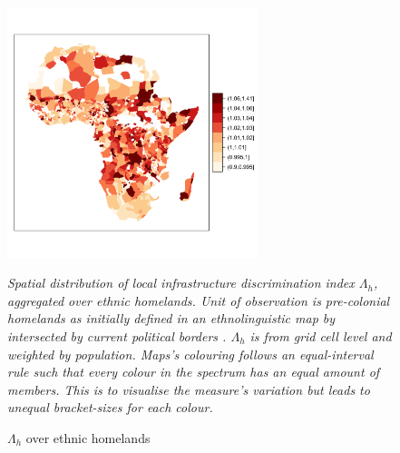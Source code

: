 \documentclass[11pt, oneside]{article}   	%
\newcommand{\mysubcaption}[1]{
\justify
\begin{spacing}{0.7}
\textit{\footnotesize #1}
\end{spacing}}
\begin{document}
\begin{figure}[!ph]
\centering
\caption{$\Lambda_{h}$ over ethnic homelands}

\includegraphics[width=0.65\textwidth,trim={1cm 4cm 0cm 4.5cm},clip]{../../Analysis/output/other_maps/ethnicity_zeta.png}


\label{fig:ethn_maps}
\mysubcaption{Spatial distribution of local infrastructure discrimination index $\Lambda_{h}$, aggregated over ethnic homelands. Unit of observation is pre-colonial homelands as initially defined in an ethnolinguistic map by \cite{Murdock_Africaitspeoples_1959} intersected by current political borders  \citep[following][]{Michalopoulos_LongRunEffectsScramble_2016}. $\Lambda_{h}$ is from grid cell level and weighted by population. Maps's colouring follows an equal-interval rule such that every colour in the spectrum has an equal amount of members. This is to visualise the measure's variation but leads to unequal bracket-sizes for each colour.}
\end{figure}
\end{document}
